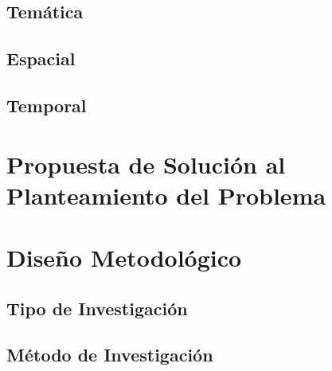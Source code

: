 \documentclass{univalle-perfil}
\begin{document}
\subsection{Temática}


\subsection{Espacial}


\subsection{Temporal}


\section{Propuesta de Solución al Planteamiento del Problema}


\section{Diseño Metodológico}

\subsection{Tipo de Investigación}


\subsection{Método de Investigación}
\end{document}
